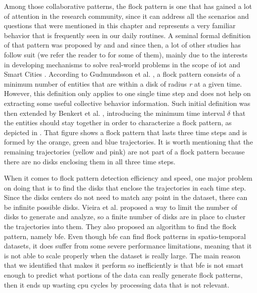 Among those collaborative patterns, the flock pattern is one that has gained a lot of attention in the research
community, since it can address all the scenarios and questions that were mentioned in this chapter and represents a
very familiar behavior that is frequently seen in our daily routines. A seminal formal definition of that pattern was
proposed by \citep{remo} and \citep{gudefficient} and since then, a lot of other studies has follow suit (we refer the
reader to  for some of them), mainly due to the interests in developing mechanisms to solve
real-world problems in the scope of \ac{iot} \citep{iot} and Smart Cities \citep{smartcities}. According to Gudmundsson
et al. \citep{gudefficient}, a flock pattern consists of a minimum number of entities that are within a disk of radius
\textit{r} at a given time.  However, this definition only applies to one single time step and does not help on
extracting some useful collective behavior information. Such initial definition was then extended by Benkert et al.
\citep{gudreportingflock}, introducing the minimum time interval $\delta$ that the entities should stay together in
order to characterize a flock pattern, as depicted in . That figure shows a flock pattern that lasts
three time steps and is formed by the orange, green and blue trajectories. It is worth mentioning that the remaining
trajectories (yellow and pink) are not part of a flock pattern because there are no disks enclosing them in all three
time steps.

When it comes to flock pattern detection efficiency and speed, one major problem on doing that is to find the disks that
enclose the trajectories in each time step. Since the disks centers do not need to match any point in the dataset, there
can be infinite possible disks. Vieira et al. \citep{vieira} proposed a way to limit the number of disks to generate and
analyze, so a finite number of disks are in place to cluster the trajectories into them. They also proposed an algorithm
to find the flock pattern, namely \ac{bfe}. Even though \ac{bfe} can find flock patterns in spatio-temporal datasets, it
does suffer from some severe performance limitations, meaning that it is not able to scale properly when the dataset is
really large. The main reason that we identified that makes it perform so inefficiently is that \ac{bfe} is not smart
enough to predict what portions of the data can really generate flock patterns, then it ends up wasting \ac{cpu} cycles
by processing data that is not relevant.

